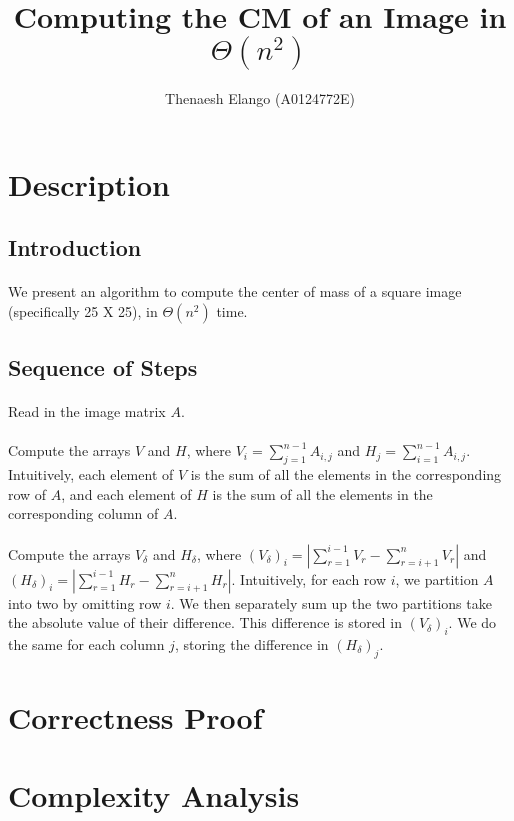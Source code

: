 \documentclass[]{article}
\title{Computing the CM of an Image in $\Theta(n^2)$}
\author{Thenaesh Elango (A0124772E)}
\begin{document}
	
	
	\maketitle
	
	\section{Description}
		\subsection{Introduction}
			\paragraph{}
			We present an algorithm to compute the center of mass of a square image (specifically 25 X 25), in $\Theta(n^2)$ time.
		
		\subsection{Sequence of Steps}
			\paragraph{}
			Read in the image matrix $A$.
			\paragraph{}
			Compute the arrays $V$ and $H$, where $V_i = \sum\nolimits_{j = 1}^{n - 1} A_{i,j}$ and $H_j = \sum\nolimits_{i = 1}^{n - 1} A_{i,j}$. Intuitively, each element of $V$ is the sum of all the elements in the corresponding row of $A$, and each element of $H$ is the sum of all the elements in the corresponding column of $A$.
			\paragraph{}
			Compute the arrays $V_\delta$ and $H_\delta$, where $(V_\delta)_i = |\sum\nolimits_{r = 1}^{i - 1} V_r - \sum\nolimits_{r = i + 1}^{n} V_r|$ and $(H_\delta)_i = |\sum\nolimits_{r = 1}^{i - 1} H_r - \sum\nolimits_{r = i + 1}^{n} H_r|$. Intuitively, for each row $i$, we partition $A$ into two by omitting row $i$. We then separately sum up the two partitions take the absolute value of their difference. This difference is stored in $(V_\delta)_i.$ We do the same for each column $j$, storing the difference in $(H_\delta)_j$.
	
	\section{Correctness Proof}
	
	\section{Complexity Analysis}
	
	
\end{document}
